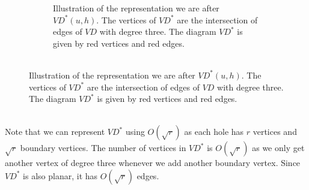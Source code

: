 \begin{figure}
\begin{subfigure}[b]{0.45\textwidth}
    \caption{Illustration of the representation we are after $VD^*(u,h)$. The vertices of
      $VD^*$ are the intersection of edges of $VD$ with degree three. The diagram $VD^*$
    is given by red vertices and red edges.\\ \\}
    \label{awvd2}
  \end{subfigure}
  \label{awvd}
\end{figure}
Note that we can represent $VD^*$ using $O(\sqrt{r})$ as each hole has $r$ vertices and
$\sqrt{r}$ boundary vertices. The number of vertices in $VD^*$ is $O(\sqrt{r})$ as we
only get another vertex of degree three whenever we add another boundary vertex. Since
$VD^*$ is also planar, it has $O(\sqrt{r})$ edges.

